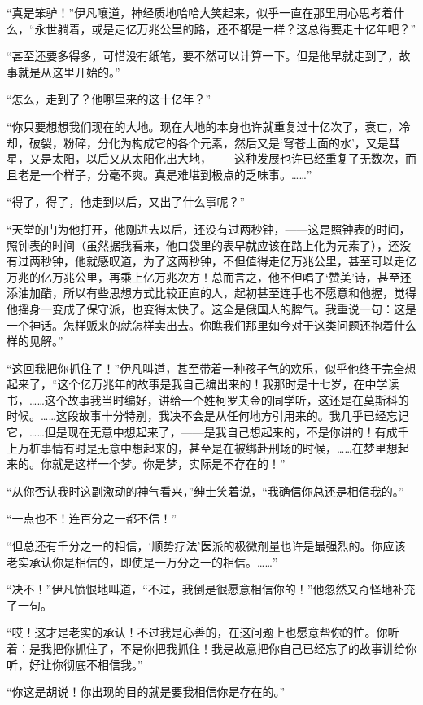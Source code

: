 \par “真是笨驴！”伊凡嚷道，神经质地哈哈大笑起来，似乎一直在那里用心思考着什么，“永世躺着，或是走亿万兆公里的路，还不都是一样？这总得要走十亿年吧？”
\par “甚至还要多得多，可惜没有纸笔，要不然可以计算一下。但是他早就走到了，故事就是从这里开始的。”
\par “怎么，走到了？他哪里来的这十亿年？”
\par “你只要想想我们现在的大地。现在大地的本身也许就重复过十亿次了，衰亡，冷却，破裂，粉碎，分化为构成它的各个元素，然后又是‘穹苍上面的水’，又是彗星，又是太阳，以后又从太阳化出大地，——这种发展也许已经重复了无数次，而且老是一个样子，分毫不爽。真是难堪到极点的乏味事。……”
\par “得了，得了，他走到以后，又出了什么事呢？”
\par “天堂的门为他打开，他刚进去以后，还没有过两秒钟，——这是照钟表的时间，照钟表的时间（虽然据我看来，他口袋里的表早就应该在路上化为元素了），还没有过两秒钟，他就感叹道，为了这两秒钟，不但值得走亿万兆公里，甚至可以走亿万兆的亿万兆公里，再乘上亿万兆次方！总而言之，他不但唱了‘赞美’诗，甚至还添油加醋，所以有些思想方式比较正直的人，起初甚至连手也不愿意和他握，觉得他摇身一变成了保守派，也变得太快了。这全是俄国人的脾气。我重说一句：这是一个神话。怎样贩来的就怎样卖出去。你瞧我们那里如今对于这类问题还抱着什么样的见解。”
\par “这回我把你抓住了！”伊凡叫道，甚至带着一种孩子气的欢乐，似乎他终于完全想起来了，“这个亿万兆年的故事是我自己编出来的！我那时是十七岁，在中学读书，……这个故事我当时编好，讲给一个姓柯罗夫金的同学听，这还是在莫斯科的时候。……这段故事十分特别，我决不会是从任何地方引用来的。我几乎已经忘记它，……但是现在无意中想起来了，——是我自己想起来的，不是你讲的！有成千上万桩事情有时是无意中想起来的，甚至是在被绑赴刑场的时候，……在梦里想起来的。你就是这样一个梦。你是梦，实际是不存在的！”
\par “从你否认我时这副激动的神气看来，”绅士笑着说，“我确信你总还是相信我的。”
\par “一点也不！连百分之一都不信！”
\par “但总还有千分之一的相信，‘顺势疗法’医派的极微剂量也许是最强烈的。你应该老实承认你是相信的，即使是一万分之一的相信。……”
\par “决不！”伊凡愤恨地叫道，“不过，我倒是很愿意相信你的！”他忽然又奇怪地补充了一句。
\par “哎！这才是老实的承认！不过我是心善的，在这问题上也愿意帮你的忙。你听着：是我把你抓住了，不是你把我抓住！我是故意把你自己已经忘了的故事讲给你听，好让你彻底不相信我。”
\par “你这是胡说！你出现的目的就是要我相信你是存在的。”
